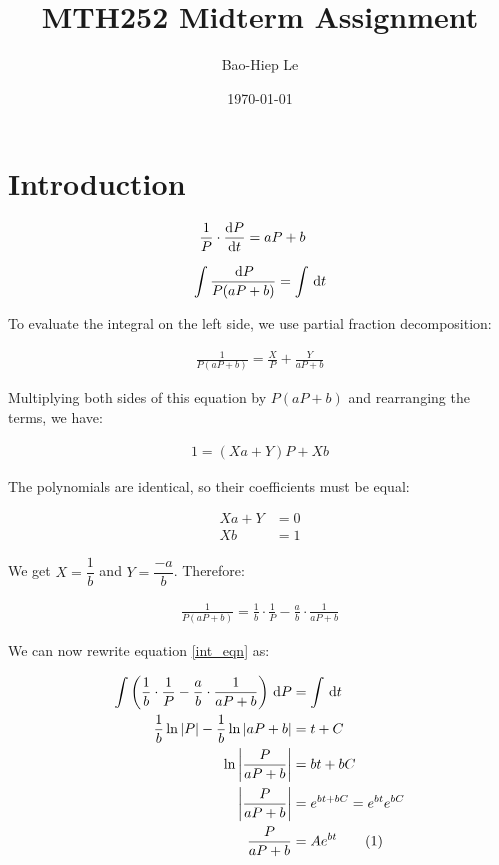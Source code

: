 \documentclass[12pt]{article}
\title{MTH252 Midterm Assignment}
\author{Bao-Hiep Le}
\date{\today}
\newcommand{\abs}[1]{\left | #1 \right |}
\newcommand\numberthis{\addtocounter{equation}{1}\tag{\theequation}}
\begin{document}
\maketitle

\section{Introduction}

\begin{align*}
\frac{1}{P} \cdot \diff{P}{t} &= aP + b
\end{align*}

\begin{equation} \label{int_eqn}
\int \frac{\dl{P}}{P(aP + b)} = \int \dl{t}
\end{equation}

To evaluate the integral on the left side, we use partial fraction decomposition:

\begin{align*}
\frac{1}{P(aP + b)} = \frac{X}{P} + \frac{Y}{aP + b}
\end{align*}

Multiplying both sides of this equation by $P(aP + b)$ and rearranging the terms, we have:

\begin{align*}
1 = (Xa + Y)P + Xb
\end{align*}

The polynomials are identical, so their coefficients must be equal:

\begin{align*}
Xa + Y &= 0 \\
Xb &= 1
\end{align*}

We get $X = \dfrac{1}{b}$ and $Y = \dfrac{-a}{b}$. Therefore:

\begin{align*}
\frac{1}{P(aP + b)} = \frac{1}{b} \cdot \frac{1}{P} - \frac{a}{b} \cdot \frac{1}{aP + b}
\end{align*}

We can now rewrite equation \ref{int_eqn} as:

\begin{align*}
\int \left ( \frac{1}{b} \cdot \frac{1}{P} - \frac{a}{b} \cdot \frac{1}{aP + b} \right ) \dl{P} &= \int \dl{t} \\
\frac{1}{b} \ln \abs{P} - \frac{1}{b} \ln \abs{aP + b} &= t + C \\
\ln \abs{\frac{P}{aP + b}} &= bt + bC \\
\abs{\frac{P}{aP + b}} &= e^{bt + bC} = e^{bt}e^{bC} \\
\frac{P}{aP + b} &= Ae^{bt} \numberthis \label{int2_eqn}
\end{align*}
\end{document}
